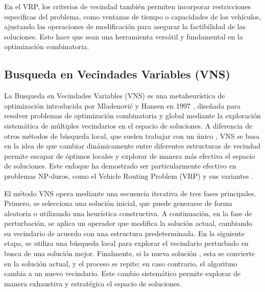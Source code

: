 \documentclass[12pt]{article}
\begin{document}
En el VRP, los criterios de vecindad también permiten incorporar restricciones específicas del problema, como ventanas de tiempo o capacidades de los vehículos, ajustando las operaciones de modificación para asegurar la factibilidad de las soluciones. Esto hace que sean una herramienta versátil y fundamental en la optimización combinatoria.



\subsection{Busqueda en Vecindades Variables (VNS)}

La Busqueda en Vecindades Variables (VNS) es una metaheurística de optimización introducida por Mladenović y Hansen en 1997 \agregaesto{[REF]}, diseñada para resolver problemas de optimización combinatoria y global mediante la exploración sistemática de múltiples vecindarios en el espacio de soluciones. A diferencia de otros métodos de búsqueda local, que suelen trabajar con un único , VNS se basa en la idea de que cambiar dinámicamente entre diferentes estructuras de vecindad permite escapar de óptimos locales y explorar de manera más efectiva el espacio de soluciones. Este enfoque ha demostrado ser particularmente efectivo en problemas NP-duros, como el Vehicle Routing Problem (VRP) y sus variantes \agregaesto{[REF]}.

El método VNS opera mediante una secuencia iterativa de tres fases principales. Primero, se selecciona una solución inicial, que puede generarse de forma aleatoria o utilizando una heurística constructiva. A continuación, en la fase de perturbación, se aplica un operador que modifica la solución actual, cambiando su vecindario de acuerdo con una estructura predeterminada. En la siguiente etapa, se utiliza una búsqueda local para explorar el vecindario perturbado en busca de una solución mejor. Finalmente, si la nueva solución , esta se convierte en la solución actual, y el proceso se repite; en caso contrario, el algoritmo cambia a un nuevo vecindario. Este cambio sistemático permite explorar de manera exhaustiva y estratégica el espacio de soluciones.

\end{document}
